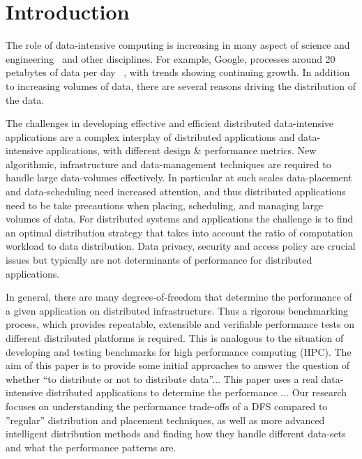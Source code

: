 \documentclass{rspublic}
\begin{document}

\section{Introduction} 

The role of data-intensive computing is increasing in many aspect of
science and engineering~\cite{fourthparadigm} and other
disciplines. For example, Google, processes around 20 petabytes of
data per day ~\citep{google}, with trends showing continuing
growth. In addition to increasing volumes of data, there are several
reasons driving the distribution of the data.

The challenges in developing effective and efficient distributed
data-intensive applications are a complex interplay of distributed
applications and data-intensive applications, with different design \&
performance metrics. New algorithmic, infrastructure and
data-management techniques are required to handle large data-volumes
effectively. In particular at such scales data-placement and
data-scheduling need increased attention, and thus distributed
applications need to be take precautions when placing, scheduling, and
managing large volumes of data. For distributed systems and
applications the challenge is to find an optimal distribution strategy
that takes into account the ratio of computation workload to data
distribution. Data privacy, security and access policy are crucial
issues but typically are not determinants of performance for
distributed applications.


In general, there are many degrees-of-freedom that determine the
performance of a given application on distributed infrastructure. Thus
a rigorous benchmarking process, which provides repeatable, extensible
and verifiable performance tests on different distributed platforms is
required. This is analogous to the situation of developing and
testing benchmarks for high performance computing (HPC). The aim of
this paper is to provide some initial approaches to answer the
question of whether ``to distribute or not to distribute data''...
This paper uses a real data-intensive distributed applications to
determine the performance ... Our research focuses on understanding
the performance trade-offs of a DFS compared to ''regular''
distribution and placement techniques, as well as more advanced
intelligent distribution methods and finding how they handle different
data-sets and what the performance patterns are.
\end{document}
